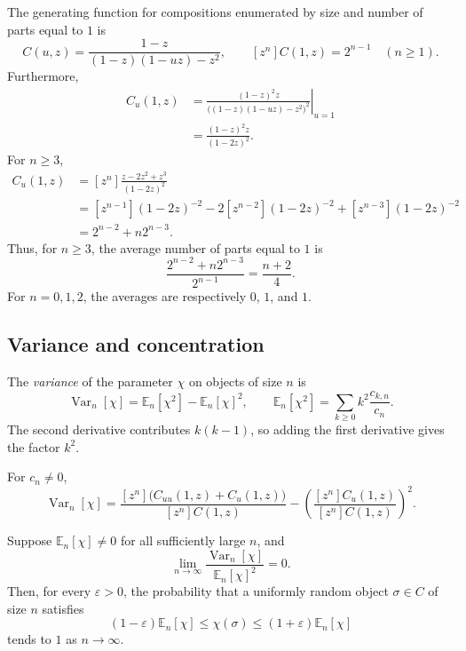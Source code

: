 \begin{example}
The generating function for compositions enumerated by size and number of parts equal to $1$ is
\[
C(u,z)=\frac{1-z}{(1-z)(1-uz)-z^2},
\qquad [z^n]C(1,z)=2^{n-1}\quad(n\ge1).
\]
Furthermore,
\begin{align*}
C_u(1,z)
&=\left.\frac{(1-z)^2z}{\bigl((1-z)(1-uz)-z^2\bigr)^2}\right|_{u=1}\\
&=\frac{(1-z)^2z}{(1-2z)^2}.
\end{align*}
For $n\ge3$,
\begin{align*}
[z^n]C_u(1,z)
&=[z^n]\frac{z-2z^2+z^3}{(1-2z)^2}\\
&=[z^{n-1}](1-2z)^{-2}
 -2[z^{n-2}](1-2z)^{-2}
 +[z^{n-3}](1-2z)^{-2}\\
&=2^{n-2}+n2^{n-3}.
\end{align*}
Thus, for $n\ge3$, the average number of parts equal to $1$ is
\[
\frac{2^{n-2}+n2^{n-3}}{2^{n-1}}=\frac{n+2}{4}.
\]
For $n=0,1,2$, the averages are respectively $0$, $1$, and $1$.
\end{example}

\subsection{Variance and concentration}
The \textit{variance} of the parameter $\chi$ on objects of size $n$ is
\[
\operatorname{Var}_n[\chi]=\mathbb E_n[\chi^2]-\mathbb E_n[\chi]^2,
\qquad
\mathbb E_n[\chi^2]=\sum_{k\ge0}k^2\frac{c_{k,n}}{c_n}.
\]
The second derivative contributes $k(k-1)$, so adding the first derivative gives the factor $k^2$.
\begin{proposition}
For $c_n\ne0$,
\[
\operatorname{Var}_n[\chi]
=\frac{[z^n]\bigl(C_{uu}(1,z)+C_u(1,z)\bigr)}{[z^n]C(1,z)}
-\left(\frac{[z^n]C_u(1,z)}{[z^n]C(1,z)}\right)^2.
\]
\end{proposition}
\begin{proposition}
Suppose $\mathbb E_n[\chi]\ne0$ for all sufficiently large $n$, and
\[
\lim_{n\to\infty}\frac{\operatorname{Var}_n[\chi]}{\mathbb E_n[\chi]^2}=0.
\]
Then, for every $\varepsilon>0$, the probability that a uniformly random object $\sigma\in C$ of size $n$ satisfies
\[
(1-\varepsilon)\mathbb E_n[\chi]\le\chi(\sigma)
\le(1+\varepsilon)\mathbb E_n[\chi]
\]
tends to $1$ as $n\to\infty$.
\end{proposition}

